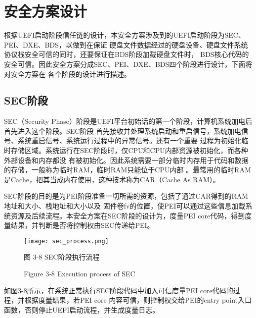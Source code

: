 %
%
\section{安全方案设计}
根据UEFI启动阶段信任链的设计，本安全方案涉及到的UEFI启动阶段为SEC、PEI、DXE、BDS，以做到在保证
硬盘文件数据经过的硬盘设备、硬盘文件系统协议栈安全可信的同时，还要保证在BDS阶段加载硬盘文件时，
BDS核心代码的安全可信。因此安全方案分成SEC、PEI、DXE、BDS四个阶段进行设计\cite{english1}，下面将对安全方案在
各个阶段的设计进行描述。

\subsection{SEC阶段}
SEC（Security Phase）阶段是UEFI平台初始话的第一个阶段，计算机系统加电后首先进入这个阶段。SEC阶段
首先接收并处理系统启动和重启信号，系统加电信号、系统重启信号、系统运行过程中的异常信号。还有一个重要
过程为初始化临时存储区域。系统运行在SEC阶段时，仅CPU和CPU内部资源被初始化，而各种外部设备和内存都没
有被初始化。因此系统需要一部分临时内存用于代码和数据的存储，一般称为临时RAM，临时RAM只能位于CPU内部
。最常用的临时RAM是Cache，把其当成内存使用，这种技术称为CAR（Cache As RAM）。
\par SEC阶段的目的是为PEI阶段准备一切所需的资源，包括了通过CAR得到的RAM地址和大小、栈地址和大小以及
固件卷fv的位置，使PEI可以通过这些信息加载系统资源及后续流程。本安全方案在SEC阶段的设计为，度量PEI 
core代码，得到度量结果，并判断是否将控制权由SEC传递给PEI。

\begin{figure}[htb]
    \label{ffs_format}
    \vspace{0cm}   
    \setlength{\abovecaptionskip}{0.3cm}
	\centering
    \texttt{[image: sec\_process.png]}
    \caption*{图 3-8 SEC阶段执行流程}
    \setlength{\belowcaptionskip}{-0.7cm}
    \caption*{Figure 3-8 Execution process of SEC}
\end{figure}

如图3-8所示，在系统正常执行SEC阶段代码中加入可信度量PEI core代码的过程，并根据度量结果，若PEI core
内容可信，则控制权交给PEI的entry point入口函数，否则停止UEFI启动流程，并生成度量日志。


